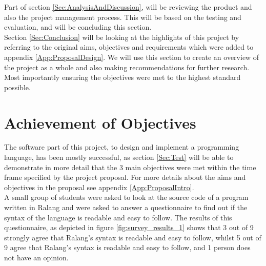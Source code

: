 \documentclass[a4paper]{article}
\begin{document}
	Part of section \ref{Sec:AnalysisAndDiscussion}, will be reviewing the product and also the project management process. This will be based on the testing and evaluation, and will be concluding this section.\\
	
	Section \ref{Sec:Conclusion} will be looking at the highlights of this project by referring to the original aims, objectives and requirements which were added to appendix \ref{App:ProposalDesign}. We will use this section to create an overview of the project as a whole and also making recommendations for further research. Most importantly ensuring the objectives were met to the highest standard possible.
	\newpage
	\section{Achievement of Objectives}
	\label{Sec:Objectives}
	The software part of this project, to design and implement a programming language, has been mostly successful, as section \ref{Sec:Test} will be able to demonstrate in more detail that the 3 main objectives were met within the time frame specified by the project proposal. For more details about the aims and objectives in the proposal see appendix \ref{App:ProposalIntro}.\\
	
	A small group of students were asked to look at the source code of a program written in Ralang and were asked to answer a questionnaire to find out if the syntax of the language is readable and easy to follow. The results of this questionnaire, as depicted in figure \ref{fig:survey_results_1} shows that 3 out of 9 strongly agree that Ralang's syntax is readable and easy to follow, whilst 5 out of 9 agree that Ralang's syntax is readable and easy to follow, and 1 person does not have an opinion.\\
	
\end{document}

